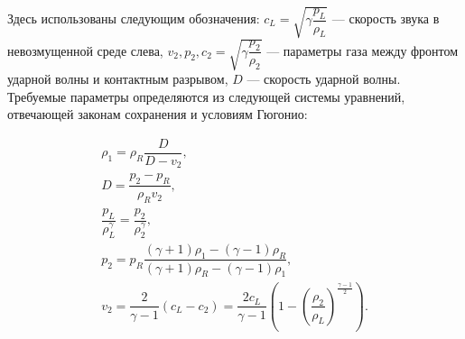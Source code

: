 \documentclass[a4paper]{article}
\begin{document}
	Здесь использованы следующим обозначения: $c_L = \sqrt{\gamma \dfrac{p_L}{\rho_L}}$ --- скорость звука в невозмущенной среде слева, $v_2, p_2, c_2 = \sqrt{\gamma \dfrac{p_2}{\rho_2}}$ --- параметры газа между фронтом ударной волны и контактным разрывом, $D$ --- скорость ударной волны.
	Требуемые параметры определяются из следующей системы уравнений, отвечающей законам сохранения и условиям Гюгонио:
	
	\begin{gather}
		\rho_1 = \rho_R \dfrac{D}{D-v_2}	,\\[5pt]
		D = \dfrac{p_2 - p_R}{\rho_R v_2}	,\\[5pt]
		\dfrac{p_L}{\rho_L^\gamma} = \dfrac{p_2}{\rho_2^\gamma}	,\\[5pt]
		p_2 = p_R \dfrac{(\gamma + 1)\rho_1 - (\gamma-1)\rho_R}
						{(\gamma + 1)\rho_R - (\gamma-1)\rho_1}	,\\[5pt]		
		v_2 = \dfrac{2}{\gamma-1}\left(c_L-c_2\right) = \dfrac{2c_L}{\gamma-1} \left(1 - \left(\dfrac{\rho_2}{\rho_L}\right)^{\frac{\gamma-1}{2}}\right)	.
	\end{gather}
	
	
	
	
\end{document}
